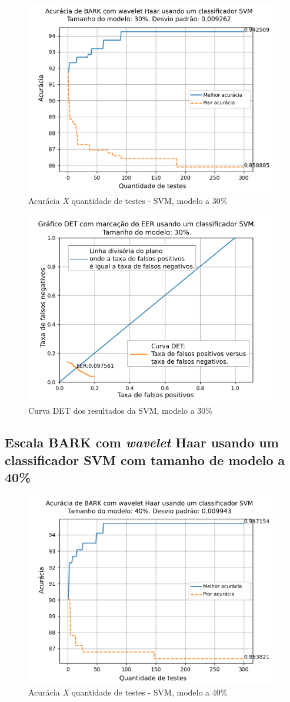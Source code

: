			\begin{figure}[ht]
				\centering
				\includegraphics[width=.6\linewidth]{images/results/confusionMatrices/classifier_SVM_30.png}
				\caption{Acurácia \textit{X} quantidade de testes - SVM, modelo a 30\%}
				\label{fig:classifiersvm30}
			\end{figure}
		
			\begin{figure}[H]
				\centering
				\includegraphics[width=.6\linewidth]{images/results/det/DET_SVM_30}
				\caption{Curva DET dos resultados da SVM, modelo a 30\%}
				\label{fig:detsvm30}
			\end{figure}
	
			\FloatBarrier
		\subsection{Escala BARK com \textit{wavelet} Haar usando um classificador SVM com tamanho de modelo a 40\%}
			
			
			\begin{figure}[ht]
				\centering
				\includegraphics[width=.6\linewidth]{images/results/confusionMatrices/classifier_SVM_40.png}
				\caption{Acurácia \textit{X} quantidade de testes - SVM, modelo a 40\%}
				\label{fig:classifiersvm40}
			\end{figure}
		
